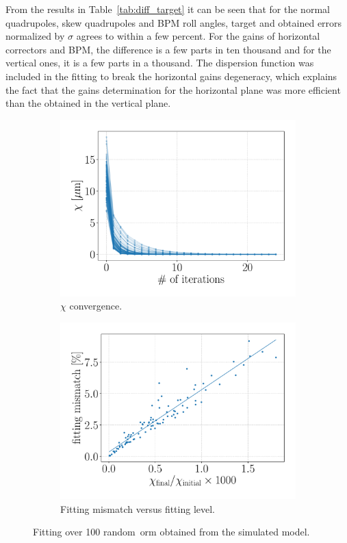 From the results in Table~\ref{tab:diff_target} it can be seen that for the normal quadrupoles, skew quadrupoles and BPM roll angles, target and obtained errors normalized by $\sigma$ agrees to within a few percent. For the gains of horizontal correctors and BPM, the difference is a few parts in ten thousand and for the vertical ones, it is a few parts in a thousand. The dispersion function was included in the fitting to break the horizontal gains degeneracy, which explains the fact that the gains determination for the horizontal plane was more efficient than the obtained in the vertical plane.
\begin{figure}
\centering
\begin{subfigure}[t]{0.49\textwidth}
\includegraphics[width=1.0\textwidth]{figures/chi_seeds_grid_big.pdf}
    \caption{$\chi$ convergence.}
    \label{subfig:chi_seeds}
\end{subfigure}
 \begin{subfigure}[t]{0.49\textwidth}
\includegraphics[width=1.0\textwidth]{figures/chi_versus_score_grid_big.pdf}
    \caption{Fitting mismatch versus fitting level.}
    \label{subfig:chi_versus_score}
\end{subfigure}
\caption{Fitting over 100 random~\gls{orm} obtained from the simulated model.}
\label{fig:fitting_seeds}
\end{figure}
